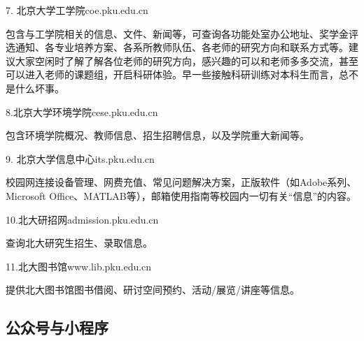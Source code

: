 7. 北京大学工学院\quad coe.pku.edu.cn

包含与工学院相关的信息、文件、新闻等，可查询各功能处室办公地址、奖学金评选通知、各专业培养方案、各系所教师队伍、各老师的研究方向和联系方式等。建议大家空闲时了解了解各位老师的研究方向，感兴趣的可以和老师多多交流，甚至可以进入老师的课题组，开启科研体验。早一些接触科研训练对本科生而言，总不是什么坏事。

\vspace{10pt}

8.北京大学环境学院\quad cese.pku.edu.cn

包含环境学院概况、教师信息、招生招聘信息，以及学院重大新闻等。

\vspace{10pt}

9. 北京大学信息中心\quad its.pku.edu.cn

校园网连接设备管理、网费充值、常见问题解决方案，正版软件（如Adobe系列、Microsoft Office、MATLAB等），邮箱使用指南等校园内一切有关“信息”的内容。

\vspace{10pt}

10.北大研招网\quad admission.pku.edu.cn

查询北大研究生招生、录取信息。

\vspace{10pt}

11.北大图书馆\quad www.lib.pku.edu.cn

提供北大图书馆图书借阅、研讨空间预约、活动/展览/讲座等信息。
	
\newpage

\subsection{公众号与小程序}

